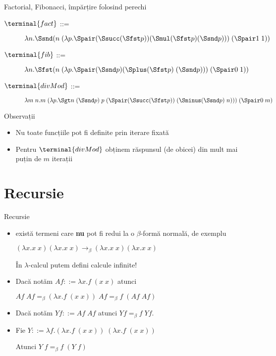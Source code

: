 \documentclass[xcolor=pdftex,romanian,colorlinks]{beamer}
\newcommand{\ra}{\rightarrow}
\begin{document}
\begin{frame}{Factorial, Fibonacci, împărțire folosind perechi}
  \begin{description}
    \item[$\terminal{fact}$ ::= ] $\lambda n.\Ssnd (n\;(\lambda p. \Spair (\Ssucc (\Sfst p)) (\Smul (\Sfst p) (\Ssnd p)))\;(\Spair 1\; 1))$
    \pause
    \item[$\terminal{fib}$ ::= ] $\lambda n.\Sfst (n\; (\lambda p. \Spair (\Ssnd p) (\Splus (\Sfst p)\; (\Ssnd p)))\; (\Spair 0\; 1))$
    \pause
    \item[$\terminal{divMod}$ ::= ] $\lambda m\; n. m\; (\lambda p. \Sgt n\; (\Ssnd p)\; p\; (\Spair (\Ssucc (\Sfst p))\; (\Sminus (\Ssnd p)\; n)))\; (\Spair 0\; m)$
  \end{description}

    \pause
  \begin{block}{Observații}
    \begin{itemize}
      \item Nu toate funcțiile pot fi definite prin iterare fixată
      \item Pentru $\terminal{divMod}$ obținem răspunsul (de obicei) din mult mai puțin de $m$ iterații
    \end{itemize}
  \end{block}
\end{frame}

\section{Recursie}
\begin{frame}[fragile]{Recursie}
\begin{itemize}
\item exist\u a termeni care {\bf nu} pot fi redu\sh i la o $\beta$-form\u a normal\u a, de exemplu 

$(\lambda x. x\; x)(\lambda x. x\; x)\ra_\beta (\lambda x. x\; x)(\lambda x. x\; x)$

\^{I}n $\lambda$-calcul putem defini calcule infinite!

\pause

\item Dac\u a not\u am $Af ::= \lambda x. f\; (x\; x)$ atunci 

$Af\; Af =_\beta (\lambda x. f\; (x\; x))\; Af =_\beta f\; (Af\; Af)$

\item Dac\u a not\u am $Yf ::= Af\; Af$ atunci $Yf =_\beta f\; Yf$.

\pause

\item Fie $Y ::= \lambda f. (\lambda x. f\; (x\; x))\; (\lambda x. f\; (x\; x))$

Atunci $Y\; f =_\beta f\;(Y\; f)$

\end{itemize}
\end{frame}
\end{document}
